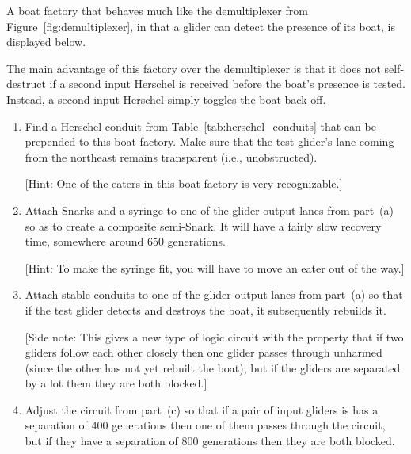 \begin{multicols}{2}
	\mfilbreak
	
	
	\begin{problem}\label{exer:toggle_better_demultiplexer}
		A boat factory that behaves much like the demultiplexer from Figure~\ref{fig:demultiplexer}, in that a glider can detect the presence of its boat, is displayed below.
		
		\begin{center}
		\end{center}
	
		\noindent The main advantage of this factory over the demultiplexer is that it does not self-destruct if a second input Herschel is received before the boat's presence is tested. Instead, a second input Herschel simply toggles the boat back off.\smallskip
	
		\begin{enumerate}[label=\bf\color{ocre}(\alph*)]
			\item {} Find a Herschel conduit from Table~\ref{tab:herschel_conduits} that can be prepended to this boat factory. Make sure that the test glider's lane coming from the northeast remains transparent (i.e., unobstructed).
			
			[Hint: One of the eaters in this boat factory is very recognizable.]
			
			\item {} Attach Snarks and a syringe to one of the glider output lanes from part~(a) so as to create a composite semi-Snark. It will have a fairly slow recovery time, somewhere around 650 generations.
			
			[Hint: To make the syringe fit, you will have to move an eater out of the way.]
			
			\item {} Attach stable conduits to one of the glider output lanes from part~(a) so that if the test glider detects and destroys the boat, it subsequently rebuilds it.
			
			[Side note: This gives a new type of logic circuit with the property that if two gliders follow each other closely then one glider passes through unharmed (since the other has not yet rebuilt the boat), but if the gliders are separated by a lot them they are both blocked.]
			
			\item {} Adjust the circuit from part~(c) so that if a pair of input gliders is has a separation of 400 generations then one of them passes through the circuit, but if they have a separation of 800 generations then they are both blocked.
		\end{enumerate}
	\end{problem}
	

\end{multicols}
